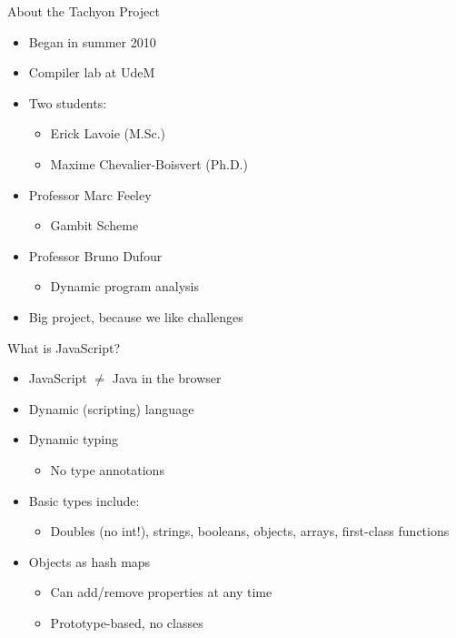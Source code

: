 \begin{frame}{About the Tachyon Project}
    \begin{itemize}
        \item Began in summer 2010
        \item Compiler lab at UdeM
        \item Two students:
        \begin{itemize}
            \item Erick Lavoie (M.Sc.)
            \item Maxime Chevalier-Boisvert (Ph.D.)
        \end{itemize}
        \item Professor Marc Feeley
        \begin{itemize}
            \item Gambit Scheme
        \end{itemize}
        \item Professor Bruno Dufour
        \begin{itemize}
            \item Dynamic program analysis
        \end{itemize}
        \item Big project, because we like challenges
    \end{itemize}
\end{frame}

\begin{frame}{What is JavaScript?}
    \begin{itemize}
        \item JavaScript $\neq$ Java in the browser
        \item Dynamic (scripting) language
        \item Dynamic typing
        \begin{itemize}
            \item No type annotations
        \end{itemize}
        \item Basic types include:
        \begin{itemize}
            \item Doubles (no int!), strings, booleans, objects, arrays, first-class functions
        \end{itemize}
        \item Objects as hash maps
        \begin{itemize}
            \item Can add/remove properties at any time
            \item Prototype-based, no classes
        \end{itemize}
    \end{itemize}
\end{frame}

